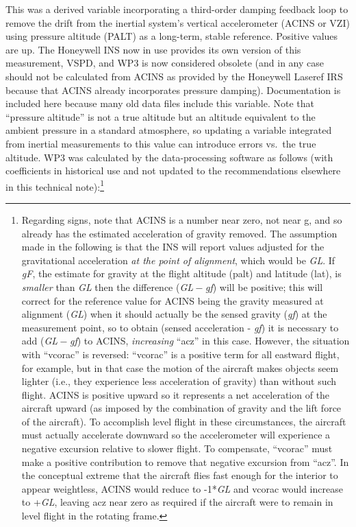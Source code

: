 \documentclass[
]{book}
\begin{document}
\protect\hypertarget{WP3ux20algorithm}{}{}This was a derived variable incorporating a third-order damping feedback loop to remove the drift from the inertial system's vertical accelerometer (ACINS or VZI) using pressure altitude (PALT) as a long-term, stable reference. Positive values are up. The Honeywell INS now in use provides its own version of this measurement, VSPD, and WP3 is now considered obsolete (and in any case should not be calculated from ACINS as provided by the Honeywell Laseref IRS because that ACINS already incorporates pressure damping). Documentation is included here because many old data files include this variable. Note that ``pressure altitude'' is not a true altitude but an altitude equivalent to the ambient pressure in a standard atmosphere, so updating a variable integrated from inertial measurements to this value can introduce errors vs.~the true altitude. WP3 was calculated by the data-processing software as follows (with coefficients in historical use and not updated to the recommendations elsewhere in this technical note):\footnote{Regarding signs, note that ACINS is a number near zero, not near g, and so already has the estimated acceleration of gravity removed. The assumption made in the following is that the INS will report values adjusted for the gravitational acceleration \emph{at the point of alignment}, which would be {\emph{G}\emph{L}}. If {\emph{g}\emph{F}}, the estimate for gravity at the flight altitude (palt) and latitude (lat), is \emph{smaller} than {\emph{G}\emph{L}} then the difference ({\emph{G}\emph{L} − \emph{g}\emph{f}}) will be positive; this will correct for the reference value for ACINS being the gravity measured at alignment ({\emph{G}\emph{L}}) when it should actually be the sensed gravity ({\emph{g}\emph{f}}) at the measurement point, so to obtain (sensed acceleration - {\emph{g}\emph{f}}) it is necessary to add ({\emph{G}\emph{L} − \emph{g}\emph{f}}) to ACINS, \emph{increasing} ``acz'' in this case. However, the situation with ``vcorac'' is reversed: ``vcorac'' is a positive term for all eastward flight, for example, but in that case the motion of the aircraft makes objects seem lighter (i.e., they experience less acceleration of gravity) than without such flight. ACINS is positive upward so it represents a net acceleration of the aircraft upward (as imposed by the combination of gravity and the lift force of the aircraft). To accomplish level flight in these circumstances, the aircraft must actually accelerate downward so the accelerometer will experience a negative excursion relative to slower flight. To compensate, ``vcorac'' must make a positive contribution to remove that negative excursion from ``acz''. In the conceptual extreme that the aircraft flies fast enough for the interior to appear weightless, ACINS would reduce to -1*{\emph{G}\emph{L}} and vcorac would increase to +{\emph{G}\emph{L}}, leaving acz near zero as required if the aircraft were to remain in level flight in the rotating frame.}
\end{document}
